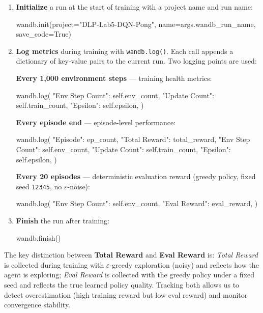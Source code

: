\documentclass[12pt,a4paper]{report}
\begin{document}
\begin{enumerate}[leftmargin=2em]
  \item \textbf{Initialize} a run at the start of training with a project name and run name:
\begin{pycode}
wandb.init(project="DLP-Lab5-DQN-Pong", name=args.wandb_run_name, save_code=True)
\end{pycode}

  \item \textbf{Log metrics} during training with \texttt{wandb.log()}.
        Each call appends a dictionary of key-value pairs to the current run.
        Two logging points are used:

        \textbf{Every 1,000 environment steps} — training health metrics:
\begin{pycode}
wandb.log({
    "Env Step Count": self.env_count,
    "Update Count":   self.train_count,
    "Epsilon":        self.epsilon,
})
\end{pycode}

        \textbf{Every episode end} — episode-level performance:
\begin{pycode}
wandb.log({
    "Episode":        ep_count,
    "Total Reward":   total_reward,
    "Env Step Count": self.env_count,
    "Update Count":   self.train_count,
    "Epsilon":        self.epsilon,
})
\end{pycode}

        \textbf{Every 20 episodes} — deterministic evaluation reward
        (greedy policy, fixed seed \texttt{12345}, no $\varepsilon$-noise):
\begin{pycode}
wandb.log({
    "Env Step Count": self.env_count,
    "Eval Reward":    eval_reward,
})
\end{pycode}

  \item \textbf{Finish} the run after training:
\begin{pycode}
wandb.finish()
\end{pycode}
\end{enumerate}

The key distinction between \textbf{Total Reward} and \textbf{Eval Reward} is:
\textit{Total Reward} is collected during training with $\varepsilon$-greedy exploration
(noisy) and reflects how the agent is exploring;
\textit{Eval Reward} is collected with the greedy policy under a fixed seed
and reflects the true learned policy quality.
Tracking both allows us to detect overestimation
(high training reward but low eval reward) and monitor convergence stability.
\end{document}
